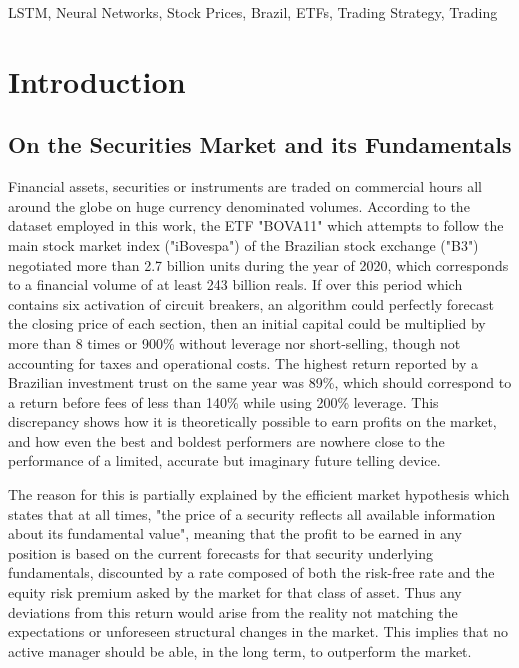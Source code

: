 \documentclass[conference]{IEEEtran}
\begin{document}
\begin{IEEEkeywords}
LSTM, Neural Networks, Stock Prices, Brazil, ETFs, Trading Strategy, Trading
\end{IEEEkeywords}

\section{Introduction}

\subsection{On the Securities Market and its Fundamentals}
Financial assets, securities or instruments are traded on commercial hours all around the globe on huge currency denominated volumes. According to the dataset employed in this work, the ETF "BOVA11" which attempts to follow the main stock market index ("iBovespa") of the Brazilian stock exchange ("B3") negotiated more than 2.7 billion units during the year of 2020, which corresponds to a financial volume of at least 243 billion reals. If over this period which contains six activation of circuit breakers, an algorithm could perfectly forecast the closing price of each section, then an initial capital could be multiplied by more than 8 times or 900\% without leverage nor short-selling, though not accounting for taxes and operational costs. The highest return reported by a Brazilian investment trust on the same year was 89\%, which should correspond to a return before fees of less than 140\% while using 200\% leverage. This discrepancy shows how it is theoretically possible to earn profits on the market, and how even the best and boldest performers are nowhere close to the performance of a limited, accurate but imaginary future telling device.

The reason for this is partially explained by the efficient market hypothesis which states that at all times, "the price of a security reflects all available information about its fundamental value", meaning that the profit to be earned in any position is based on the current forecasts for that security underlying fundamentals, discounted by a rate composed of both the risk-free rate and the equity risk premium asked by the market for that class of asset. Thus any deviations from this return would arise from the reality not matching the expectations or unforeseen structural changes in the market. This implies that no active manager should be able, in the long term, to outperform the market.
\end{document}
